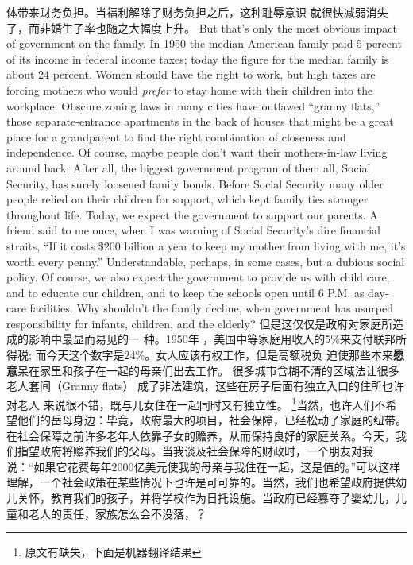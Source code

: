\begin{paracol}{2}
体带来财务负担。当福利解除了财务负担之后，这种耻辱意识
就很快减弱消失了，而非婚生子率也随之大幅度上升。
\switchcolumn*
But that's only the most obvious impact of government on
the family. In 1950 the median American family paid 5 percent
of its income in federal income taxes; today the figure for the
median family is about 24 percent. Women should have the
right to work, but high taxes are forcing mothers who would
\textit{prefer} to stay home with their children into the workplace. Obscure zoning laws in many cities have outlawed ``granny flats,''
those separate-entrance apartments in the back of houses that
might be a great place for a grandparent to find the right combination of closeness and independence. 
Of course, maybe people don't want their mothers-in-law living around back: After all, the biggest government program of them all, Social Security, has surely loosened family bonds. Before Social Security many older people relied on their children for support, which kept family ties stronger throughout life. Today, we expect the government to support our parents. A friend said to me once, when I was warning of Social Security's dire financial straits, ``If it costs \$200 billion a year to keep my mother from living with me, it's worth every penny.'' Understandable, perhaps, in some cases, but a dubious social policy. Of course, we also expect the government to provide us with child care, and to educate our children, and to keep the schools open until 6 P.M. as day-care facilities. Why shouldn't the family decline, when government has usurped responsibility for infants, children, and the elderly?
\switchcolumn
但是这仅仅是政府对家庭所造成的影响中最显而易见的一
种。1950年 ，美国中等家庭用收入的5\%来支付联邦所得税;
而今天这个数字是24\%。女人应该有权工作，但是高额税负
迫使那些本来\textbf{愿意}呆在家里和孩子在一起的母亲们出去工作。
很多城市含糊不清的区域法让很多老人套间（Granny flats）
成了非法建筑，这些在房子后面有独立入口的住所也许对老人
来说很不错，既与儿女住在一起同时又有独立性。
\footnote{原文有缺失，下面是机器翻译结果}当然，也许人们不希望他们的岳母身边：毕竟，政府最大的项目，社会保障，已经松动了家庭的纽带。在社会保障之前许多老年人依靠子女的赡养，从而保持良好的家庭关系。今天，我们指望政府将赡养我们的父母。当我谈及社会保障的财政时，一个朋友对我说：“如果它花费每年2000亿美元使我的母亲与我住在一起，这是值的。”可以这样理解，一个社会政策在某些情况下也许是可可靠的。当然，我们也希望政府提供幼儿关怀，教育我们的孩子，并将学校作为日托设施。当政府已经篡夺了婴幼儿，儿童和老人的责任，家族怎么会不没落，？


\end{paracol}
